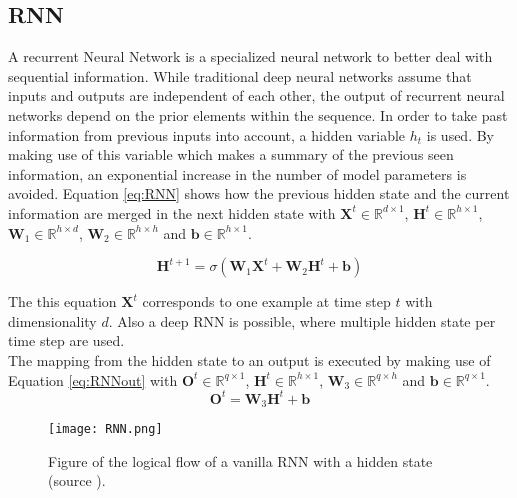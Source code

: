 \subsection{RNN}
A recurrent Neural Network is a specialized neural network to better deal with sequential information. While traditional deep neural networks assume that inputs and outputs are independent of each other, the output of recurrent neural networks depend on the prior elements within the sequence. In order to take past information from previous inputs into account, a hidden variable $ h_t $ is used. By making use of this variable which makes a summary of the previous seen information, an exponential increase in the number of model parameters is avoided. Equation \ref{eq:RNN} shows how the previous hidden state and the current information are merged in the next hidden state with $ \textbf{X}^t\in \mathbb{R}^{d\times 1} $, $ \textbf{H}^t\in \mathbb{R}^{h\times 1} $, $ \textbf{W}_1\in \mathbb{R}^{h\times d} $, $\textbf{W}_2\in \mathbb{R}^{h\times h} $ and $ \textbf{b}\in \mathbb{R}^{h\times 1} $. 

\begin{equation}\label{eq:RNN}
	\textbf{H}^{t+1} = \sigma(\textbf{W}_1\textbf{X}^{t}+\textbf{W}_2\textbf{H}^{t}+\textbf{b})
\end{equation}

The this equation $\textbf{X}^t$ corresponds to one example at time step $ t $ with dimensionality $ d $. 
Also a deep RNN is possible, where multiple hidden state per time step are used. \\

The mapping from the hidden state to an output is executed by making use of Equation \ref{eq:RNNout} with $ \textbf{O}^t\in \mathbb{R}^{q\times 1} $, $ \textbf{H}^t\in \mathbb{R}^{h\times 1} $, $ \textbf{W}_3\in \mathbb{R}^{q\times h} $ and $ \textbf{b}\in \mathbb{R}^{q\times 1} $.
\begin{equation}\label{eq:RNNout}
	\textbf{O}^{t} = \textbf{W}_3\textbf{H}^{t}+\textbf{b}
\end{equation}


\begin{figure}[h!]
	\centering
	\texttt{[image: RNN.png]}
	\caption{Figure of the logical flow of a vanilla RNN with a hidden state (source \cite{Czum2020}).}
	\label{fig:RNN}
\end{figure}




